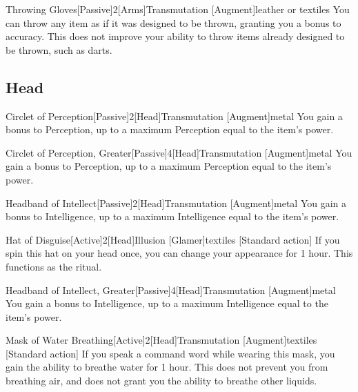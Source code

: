 \begin{magicitemdef}{Throwing Gloves}[Passive]{2}[Arms]{Transmutation [Augment]}{leather or textiles}
     You can throw any item as if it was designed to be thrown, granting you a  bonus to accuracy.
    This does not improve your ability to throw items already designed to be thrown, such as darts.
\end{magicitemdef}

\subsection{Head}

\begin{magicitemdef}{Circlet of Perception}[Passive]{2}[Head]{Transmutation [Augment]}{metal}
     You gain a  bonus to Perception, up to a maximum Perception equal to the item's power.
\end{magicitemdef}

\begin{magicitemdef}{Circlet of Perception, Greater}[Passive]{4}[Head]{Transmutation [Augment]}{metal}
     You gain a  bonus to Perception, up to a maximum Perception equal to the item's power.
\end{magicitemdef}

\begin{magicitemdef}{Headband of Intellect}[Passive]{2}[Head]{Transmutation [Augment]}{metal}
     You gain a  bonus to Intelligence, up to a maximum Intelligence equal to the item's power.
\end{magicitemdef}

\begin{magicitemdef}{Hat of Disguise}[Active]{2}[Head]{Illusion [Glamer]}{textiles}
    [Standard action] If you spin this hat on your head once, you can change your appearance for 1 hour.
    This functions as the  ritual.
\end{magicitemdef}

\begin{magicitemdef}{Headband of Intellect, Greater}[Passive]{4}[Head]{Transmutation [Augment]}{metal}
     You gain a  bonus to Intelligence, up to a maximum Intelligence equal to the item's power.
\end{magicitemdef}

\begin{magicitemdef}{Mask of Water Breathing}[Active]{2}[Head]{Transmutation [Augment]}{textiles}
    [Standard action] If you speak a command word while wearing this mask, you gain the ability to breathe water for 1 hour.
    This does not prevent you from breathing air, and does not grant you the ability to breathe other liquids.
\end{magicitemdef}

